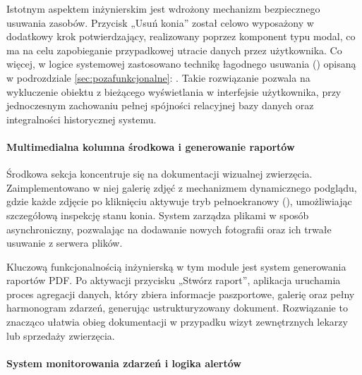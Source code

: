 Istotnym aspektem inżynierskim jest wdrożony mechanizm bezpiecznego usuwania zasobów. Przycisk „Usuń konia” został celowo wyposażony w dodatkowy krok potwierdzający, realizowany poprzez komponent typu modal, co ma na celu zapobieganie przypadkowej utracie danych przez użytkownika. Co więcej, w logice systemowej zastosowano technikę łagodnego usuwania () opisaną w podrozdziale \ref{sec:pozafunkcjonalne}: . Takie rozwiązanie pozwala na wykluczenie obiektu z bieżącego wyświetlania w interfejsie użytkownika, przy jednoczesnym zachowaniu pełnej spójności relacyjnej bazy danych oraz integralności historycznej systemu.

\paragraph{Multimedialna kolumna środkowa i generowanie raportów}

Środkowa sekcja koncentruje się na dokumentacji wizualnej zwierzęcia. Zaimplementowano w niej galerię zdjęć z mechanizmem dynamicznego podglądu, gdzie każde zdjęcie po kliknięciu aktywuje tryb pełnoekranowy (), umożliwiając szczegółową inspekcję stanu konia. System zarządza plikami w sposób asynchroniczny, pozwalając na dodawanie nowych fotografii oraz ich trwałe usuwanie z serwera plików.

Kluczową funkcjonalnością inżynierską w tym module jest system generowania raportów PDF. Po aktywacji przycisku „Stwórz raport”, aplikacja uruchamia proces agregacji danych, który zbiera informacje paszportowe, galerię oraz pełny harmonogram zdarzeń, generując ustrukturyzowany dokument. Rozwiązanie to znacząco ułatwia obieg dokumentacji w przypadku wizyt zewnętrznych lekarzy lub sprzedaży zwierzęcia.

\paragraph{System monitorowania zdarzeń i logika alertów}

